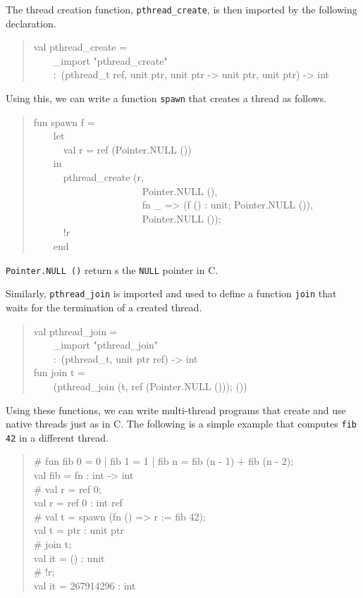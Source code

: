 \documentclass{jbook}
\newenvironment{program}{\begin{quote}\begin{tt}}%
                        {\end{tt}\end{quote}}
\begin{document}
	The thread creation function, {\tt pthread\_create}, is then
imported by the following declaration. 
\begin{program}
val pthread\_create =\\
\ \ \ \ \_import "pthread\_create"\\
\ \ \ \ :\ (pthread\_t ref, unit ptr, unit ptr -> unit ptr, unit ptr) -> int
\end{program}
	Using this, we can write a function {\tt spawn} that creates a
thread as follows.
\begin{program}
fun spawn f =\\
\ \ \ \ let\\
\ \ \ \ \ \ val r = ref (Pointer.NULL ())\\
\ \ \ \ in\\
\ \ \ \ \ \ pthread\_create (r,\\
\ \ \ \ \ \ \ \ \ \ \ \ \ \ \ \ \ \ \ \ \ \ Pointer.NULL (),\\
\ \ \ \ \ \ \ \ \ \ \ \ \ \ \ \ \ \ \ \ \ \ fn \_ => (f () : unit; Pointer.NULL ()),\\
\ \ \ \ \ \ \ \ \ \ \ \ \ \ \ \ \ \ \ \ \ \ Pointer.NULL ());\\
\ \ \ \ \ \ !r\\
\ \ \ \ end
\end{program}
	{\tt Pointer.NULL ()} return s the {\tt NULL} pointer in C.

	Similarly, {\tt pthread\_join} is imported and used to define a
function {\tt join} that waits for the termination of a created thread.
\begin{program}
val pthread\_join =\\
\ \ \ \ \_import "pthread\_join"\\
\ \ \ \ :\ (pthread\_t, unit ptr ref) -> int\\
fun join t =\\
\ \ \ \ (pthread\_join (t, ref (Pointer.NULL ())); ())
\end{program}

	Using these functions, we can write multi-thread programs
that create and use native threads just as in C.
	The following is a simple example that computes
{\tt fib 42} in a different thread.
\begin{program}
\# fun fib 0 = 0 | fib 1 = 1 | fib n = fib (n - 1) + fib (n - 2);\\
val fib = fn : int -> int\\
\# val r = ref 0;\\
val r = ref 0 : int ref\\
\# val t = spawn (fn () => r := fib 42);\\
val t = ptr : unit ptr\\
\# join t;\\
val it = () : unit\\
\# !r;\\
val it = 267914296 : int
\end{program}
\fi%
\end{document}
